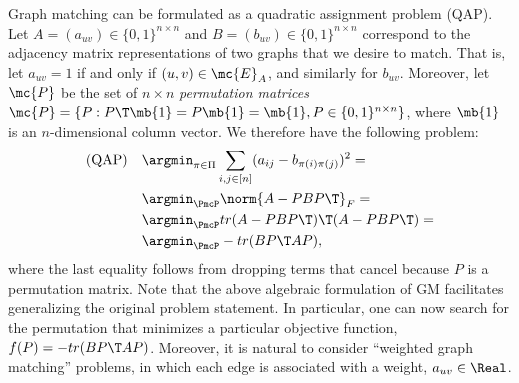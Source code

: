 \documentclass[11pt]{article}
\begin{document}
Graph matching can be formulated as a quadratic assignment problem (QAP).  Let $A=(a_{uv}) \in \{0,1\}^{n \times n}$ and $B=(b_{uv}) \in \{0,1\}^{n \times n}$ correspond to the adjacency matrix representations of two graphs that we desire to match. That is, let $a_{uv}=1$ if and only if $(u,v) \in \mc{E}_A$, and similarly for $b_{uv}$.  Moreover, let $\mc{P}$ be the set of  $n \times n$ \emph{permutation matrices}  $\mc{P}=\{P : P\T \mb{1} = P \mb{1} = \mb{1}, P \in \{0,1\}^{n \times n}\}$, where $\mb{1}$ is an $n$-dimensional column vector.
% 
We therefore have the following problem:  
\begin{subequations} \label{eq:GM}
\begin{align}
\text{(QAP)} \quad 	&\argmin_{\pi \in \Pi} \sum_{i,j \in [n]} (a_{ij} - b_{\pi(i) \pi(j)})^2= \\
	&\argmin_{\PmcP} \norm{A - PBP\T}_F = \\
	&\argmin_{\PmcP} tr(A - PBP\T)\T (A - PBP\T) = \label{eq:trQAP2} \\
	&\argmin_{\PmcP} - tr(B P\T AP), \label{eq:trQAP} %
\end{align}
\end{subequations}
where the last equality follows from dropping terms that cancel because $P$ is a permutation matrix. Note that the above algebraic formulation of GM facilitates generalizing the original problem statement. In particular, one can now search for the permutation that minimizes a particular objective function, $f(P)=- tr(B P\T AP)$.  Moreover, it is natural to consider ``weighted graph matching''  problems, in which each edge is associated with a weight, $a_{uv} \in \Real$.  
\end{document}
